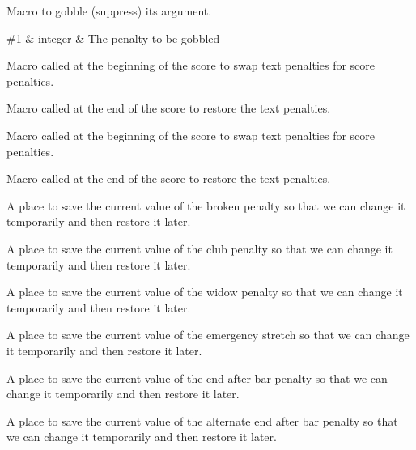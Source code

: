 Macro to gobble (suppress) its argument.

\begin{argtable}
  \#1 & integer & The penalty to be gobbled\\
\end{argtable}

Macro called at the beginning of the score to swap text penalties for score penalties.

Macro called at the end of the score to restore the text penalties.

Macro called at the beginning of the score to swap text penalties for score penalties.

Macro called at the end of the score to restore the text penalties.

A place to save the current value of the broken penalty so that we can change it temporarily and then restore it later.

A place to save the current value of the club penalty so that we can change it temporarily and then restore it later.

A place to save the current value of the widow penalty so that we can change it temporarily and then restore it later.

A place to save the current value of the emergency stretch so that we can change it temporarily and then restore it later.

A place to save the current value of the end after bar penalty so that we can change it temporarily and then restore it later.

A place to save the current value of the alternate end after bar penalty so that we can change it temporarily and then restore it later.

